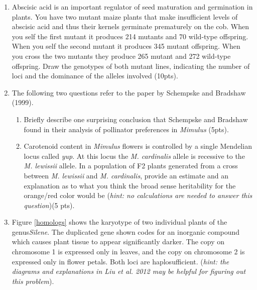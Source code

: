 \documentclass[]{article}
\begin{document}
\begin{enumerate}
\newpage

\item Abscisic acid is an important regulator of seed maturation and germination in plants. You have two mutant maize plants that make insufficient levels of abscisic acid and thus their kernels germinate prematurely on the cob. When you self the first mutant it produces 214 mutants and 70 wild-type offspring.  When you self the second mutant it produces 345 mutant offspring. When you cross the two mutants they produce 265 mutant and 272 wild-type offspring. Draw the genotypes of both mutant lines, indicating the number of loci and the dominance of the alleles involved (10pts).

\newpage
\item The following two questions refer to the paper by Schempske and Bradshaw (1999). 
\begin{enumerate}
\item Briefly describe one surprising conclusion that Schempske and Bradshaw found in their analysis of pollinator preferences in \emph{Mimulus} (5pts).


\item Carotenoid content in \emph{Mimulus} flowers is controlled by a single Mendelian locus called \emph{yup}. At this locus the \emph{M. cardinalis} allele is recessive to the \emph{M. lewissii} allele. In a population of F2 plants generated from a cross between \emph{M. lewissii}  and \emph{M. cardinalis}, provide an estimate and an explanation as to what you think the broad sense heritability for the orange/red color would be (\emph{hint: no calculations are needed to answer this question})(5 pts).
\end{enumerate}

\newpage
\item Figure \ref{homologs} shows the karyotype of two individual plants of the genus\emph{Silene}.  The duplicated gene shown codes for an inorganic compound which causes plant tissue to appear significantly darker. The copy on chromosome 1 is expressed only in leaves, and the copy on chromosome 2 is expressed only in flower petals. Both loci are haplosufficient. (\emph{hint: the diagrams and explanations in Liu et al. 2012 may be helpful for figuring out this problem}).


\end{enumerate}
\end{document}
